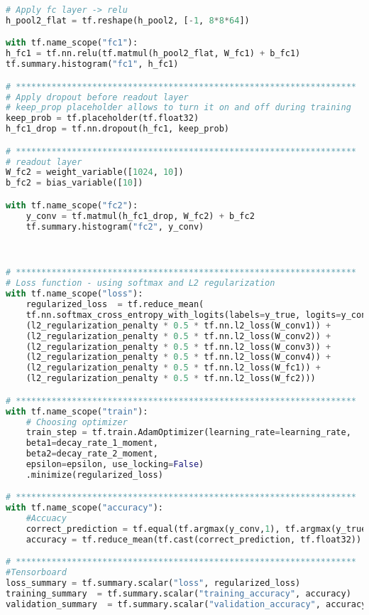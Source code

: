 \begin{lstlisting}[language=Python, label=lst:neuralnet.py, caption={neural\_net.py}, basicstyle=\tiny]
# Apply fc layer -> relu 
h_pool2_flat = tf.reshape(h_pool2, [-1, 8*8*64])

with tf.name_scope("fc1"):
h_fc1 = tf.nn.relu(tf.matmul(h_pool2_flat, W_fc1) + b_fc1)
tf.summary.histogram("fc1", h_fc1)

# *******************************************************************
# Apply dropout before readout layer
# keep_prop placeholder allows to turn it on and off during training
keep_prob = tf.placeholder(tf.float32)
h_fc1_drop = tf.nn.dropout(h_fc1, keep_prob)

# *******************************************************************
# readout layer
W_fc2 = weight_variable([1024, 10])
b_fc2 = bias_variable([10])

with tf.name_scope("fc2"):
	y_conv = tf.matmul(h_fc1_drop, W_fc2) + b_fc2
	tf.summary.histogram("fc2", y_conv)



# *******************************************************************
# Loss function - using softmax and L2 regularization
with tf.name_scope("loss"):
	regularized_loss  = tf.reduce_mean(
	tf.nn.softmax_cross_entropy_with_logits(labels=y_true, logits=y_conv) +
	(l2_regularization_penalty * 0.5 * tf.nn.l2_loss(W_conv1)) +
	(l2_regularization_penalty * 0.5 * tf.nn.l2_loss(W_conv2)) +
	(l2_regularization_penalty * 0.5 * tf.nn.l2_loss(W_conv3)) +
	(l2_regularization_penalty * 0.5 * tf.nn.l2_loss(W_conv4)) + 
	(l2_regularization_penalty * 0.5 * tf.nn.l2_loss(W_fc1)) + 
	(l2_regularization_penalty * 0.5 * tf.nn.l2_loss(W_fc2)))

# *******************************************************************
with tf.name_scope("train"):
	# Choosing optimizer
	train_step = tf.train.AdamOptimizer(learning_rate=learning_rate,
	beta1=decay_rate_1_moment, 
	beta2=decay_rate_2_moment, 
	epsilon=epsilon, use_locking=False)
	.minimize(regularized_loss)

# *******************************************************************
with tf.name_scope("accuracy"):
	#Accuacy
	correct_prediction = tf.equal(tf.argmax(y_conv,1), tf.argmax(y_true,1))
	accuracy = tf.reduce_mean(tf.cast(correct_prediction, tf.float32))

# *******************************************************************
#Tensorboard
loss_summary = tf.summary.scalar("loss", regularized_loss)
training_summary  = tf.summary.scalar("training_accuracy", accuracy)
validation_summary  = tf.summary.scalar("validation_accuracy", accuracy)


\end{lstlisting}
